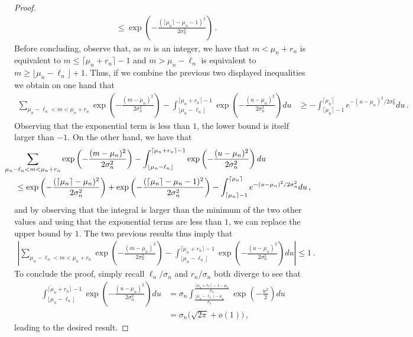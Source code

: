 \documentclass{article}
\newcommand{\1}{\mathbbm{1}}								%
\theoremstyle{definition}
\numberwithin{equation}{section}
\begin{document}
\begin{proof}
\begin{align*}
        &\leq\exp\left(-\frac{(\lceil\mu_n\rceil-\mu_n-1)^2}{2\sigma_n^2}\right)\,.
    \end{align*}
    Before concluding, observe that, as $m$ is an integer, we have that $m<\mu_n+r_n$ is equivalent to $m\leq\lceil\mu_n+r_n\rceil-1$ and $m>\mu_n-\ell_n$ is equivalent to $m\geq\lfloor\mu_n-\ell_n\rfloor+1$.
    Thus, if we combine the previous two displayed inequalities we obtain on one hand that
    \begin{align*}
        \sum_{\mu_n-\ell_n<m<\mu_n+r_n}\exp\left(-\frac{(m-\mu_n)^2}{2\sigma_n^2}\right)-\int_{\lfloor\mu_n-\ell_n\rfloor}^{\lceil\mu_n+r_n\rceil-1}\exp\left(-\frac{(u-\mu_n)^2}{2\sigma_n^2}\right)du
        &\geq-\int_{\lceil\mu_n\rceil-1}^{\lceil\mu_n\rceil}e^{-(u-\mu_n)^2/2\sigma_n^2}du\,.
    \end{align*}
    Observing that the exponential term is less than $1$, the lower bound is itself larger than $-1$.
    On the other hand, we have that
    \begin{align*}
        &\hspace{-0.5cm}\sum_{\mu_n-\ell_n<m<\mu_n+r_n}\exp\left(-\frac{(m-\mu_n)^2}{2\sigma_n^2}\right)-\int_{\lfloor\mu_n-\ell_n\rfloor}^{\lceil\mu_n+r_n\rceil-1}\exp\left(-\frac{(u-\mu_n)^2}{2\sigma_n^2}\right)du\\
        &\leq\exp\left(-\frac{(\lceil\mu_n\rceil-\mu_n)^2}{2\sigma_n^2}\right)+\exp\left(-\frac{(\lceil\mu_n\rceil-\mu_n-1)^2}{2\sigma_n^2}\right)-\int_{\lceil\mu_n\rceil-1}^{\lceil\mu_n\rceil}e^{-(u-\mu_n)^2/2\sigma_n^2}du\,,
    \end{align*}
    and by observing that the integral is larger than the minimum of the two other values and using that the exponential terms are less than $1$, we can replace the upper bound by $1$.
    The two previous results thus imply that
    \begin{align*}
        \left|\sum_{\mu_n-\ell_n<m<\mu_n+r_n}\exp\left(-\frac{(m-\mu_n)^2}{2\sigma_n^2}\right)-\int_{\lfloor\mu_n-\ell_n\rfloor}^{\lceil\mu_n+r_n\rceil-1}\exp\left(-\frac{(u-\mu_n)^2}{2\sigma_n^2}\right)du\right|\leq1\,.
    \end{align*}
    To conclude the proof, simply recall $\ell_n/\sigma_n$ and $r_n/\sigma_n$ both diverge to see that
    \begin{align*}
        \int_{\lfloor\mu_n-\ell_n\rfloor}^{\lceil\mu_n+r_n\rceil-1}\exp\left(-\frac{(u-\mu_n)^2}{2\sigma_n^2}\right)du&=\sigma_n\int_\frac{\lfloor \mu_n-\ell_n\rfloor-\mu_n}{\sigma_n}^\frac{\lceil\mu_n+r_n\rceil-1-\mu_n}{\sigma_n}\exp\left(-\frac{u^2}{2}\right)du\\
        &=\sigma_n\Big(\sqrt{2\pi}+o(1)\Big)\,,
    \end{align*}
    leading to the desired result.
\end{proof}
\end{document}
